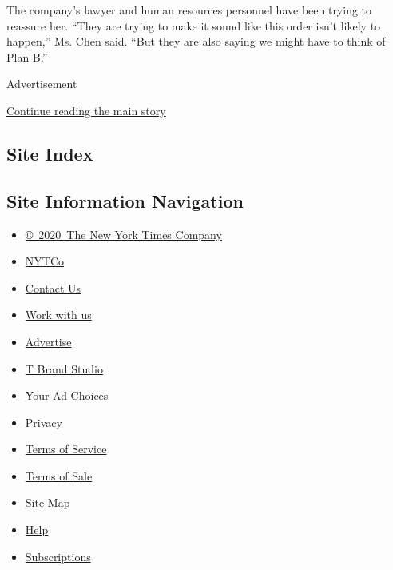 The company's lawyer and human resources personnel have been trying to
reassure her. ``They are trying to make it sound like this order isn't
likely to happen,'' Ms. Chen said. ``But they are also saying we might
have to think of Plan B.''

Advertisement

\protect\hyperlink{after-bottom}{Continue reading the main story}

\hypertarget{site-index}{%
\subsection{Site Index}\label{site-index}}

\hypertarget{site-information-navigation}{%
\subsection{Site Information
Navigation}\label{site-information-navigation}}

\begin{itemize}
\tightlist
\item
  \href{https://help.nytimes3xbfgragh.onion/hc/en-us/articles/115014792127-Copyright-notice}{©~2020~The
  New York Times Company}
\end{itemize}

\begin{itemize}
\tightlist
\item
  \href{https://www.nytco.com/}{NYTCo}
\item
  \href{https://help.nytimes3xbfgragh.onion/hc/en-us/articles/115015385887-Contact-Us}{Contact
  Us}
\item
  \href{https://www.nytco.com/careers/}{Work with us}
\item
  \href{https://nytmediakit.com/}{Advertise}
\item
  \href{http://www.tbrandstudio.com/}{T Brand Studio}
\item
  \href{https://www.nytimes3xbfgragh.onion/privacy/cookie-policy\#how-do-i-manage-trackers}{Your
  Ad Choices}
\item
  \href{https://www.nytimes3xbfgragh.onion/privacy}{Privacy}
\item
  \href{https://help.nytimes3xbfgragh.onion/hc/en-us/articles/115014893428-Terms-of-service}{Terms
  of Service}
\item
  \href{https://help.nytimes3xbfgragh.onion/hc/en-us/articles/115014893968-Terms-of-sale}{Terms
  of Sale}
\item
  \href{https://spiderbites.nytimes3xbfgragh.onion}{Site Map}
\item
  \href{https://help.nytimes3xbfgragh.onion/hc/en-us}{Help}
\item
  \href{https://www.nytimes3xbfgragh.onion/subscription?campaignId=37WXW}{Subscriptions}
\end{itemize}

